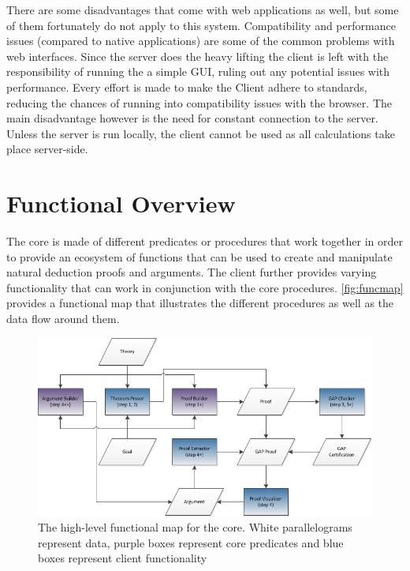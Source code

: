 \documentclass[11pt,twoside,a4paper]{report}
\begin{document}
There are some disadvantages that come with web applications as well, but some of them fortunately do not apply to this system. Compatibility and performance issues (compared to native applications) are some of the common problems with web interfaces. Since the server does the heavy lifting the client is left with the responsibility of running the a simple GUI, ruling out any potential issues with performance. Every effort is made to make the Client adhere to standards, reducing the chances of running into compatibility issues with the browser. The main disadvantage however is the need for constant connection to the server. Unless the server is run locally, the client cannot be used as all calculations take place server-side.

\section{Functional Overview}
\label{sec:coreoverview}
The core is made of different predicates or procedures that work together in order to provide an ecosystem of functions that can be used to create and manipulate natural deduction proofs and arguments. The client further provides varying functionality that can work in conjunction with the core procedures. \autoref{fig:funcmap} provides a functional map that illustrates the different procedures as well as the data flow around them.

\begin{figure}[ht]
\centerline{\includegraphics[scale=0.85]{img/functional-map.png}}
\caption{The high-level functional map for the core. White parallelograms represent data, purple boxes represent core predicates and blue boxes represent client functionality\label{fig:funcmap}}
\end{figure}
\end{document}
